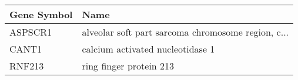 \begin{tabular}{ll}
\toprule
Gene Symbol &                                               Name \\
\midrule
    ASPSCR1 & alveolar soft part sarcoma chromosome region, c... \\
      CANT1 &                   calcium activated nucleotidase 1 \\
     RNF213 &                            ring finger protein 213 \\
\bottomrule
\end{tabular}
